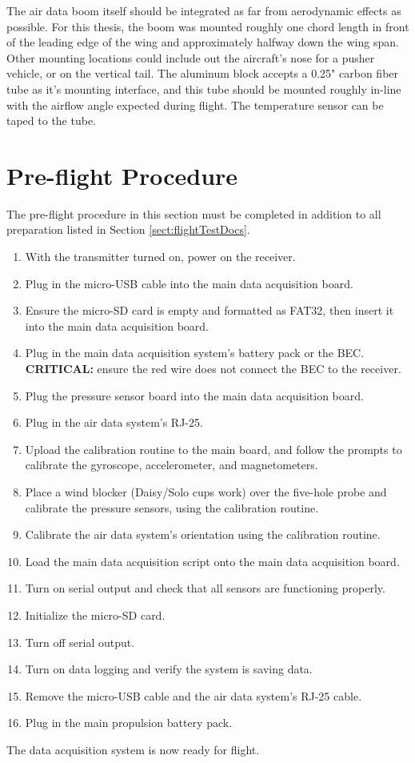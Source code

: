 The air data boom itself should be integrated as far from aerodynamic effects as possible. For this thesis, the boom was mounted roughly one chord length in front of the leading edge of the wing and approximately halfway down the wing span. Other mounting locations could include out the aircraft's nose for a pusher vehicle, or on the vertical tail. The aluminum block accepts a 0.25" carbon fiber tube as it's mounting interface, and this tube should be mounted roughly in-line with the airflow angle expected during flight. The temperature sensor can be taped to the tube.

\section{Pre-flight Procedure}
\label{sect:preFlightProc}
The pre-flight procedure in this section must be completed in addition to all preparation listed in Section \ref{sect:flightTestDocs}.

\begin{enumerate}
\item With the transmitter turned on, power on the receiver.
\item Plug in the micro-USB cable into the main data acquisition board.
\item Ensure the micro-SD card is empty and formatted as FAT32, then insert it into the main data acquisition board.
\item Plug in the main data acquisition system's battery pack or the BEC. \textbf{CRITICAL:} ensure the red wire does not connect the BEC to the receiver.
\item Plug the pressure sensor board into the main data acquisition board.
\item Plug in the air data system's RJ-25.
\item Upload the calibration routine to the main board, and follow the prompts to calibrate the gyroscope, accelerometer, and magnetometers.
\item Place a wind blocker (Daisy/Solo cups work) over the five-hole probe and calibrate the pressure sensors, using the calibration routine.
\item Calibrate the air data system's orientation using the calibration routine.
\item Load the main data acquisition script onto the main data acquisition board.
\item Turn on serial output and check that all sensors are functioning properly.
\item Initialize the micro-SD card.
\item Turn off serial output.
\item Turn on data logging and verify the system is saving data.
\item Remove the micro-USB cable and the air data system's RJ-25 cable.
\item Plug in the main propulsion battery pack.
\end{enumerate}
The data acquisition system is now ready for flight.


